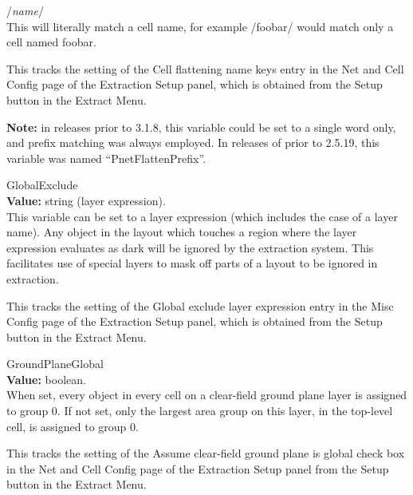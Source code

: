 \begin{description}
\begin{description}
\item{/{\it name\/}/}\\
This will literally match a cell name, for example {\vt /foobar/}
would match only a cell named {\vt foobar}.
\end{description}

This tracks the setting of the {\cb Cell flattening name keys} entry
in the {\cb Net and Cell Config} page of the {\cb Extraction Setup}
panel, which is obtained from the {\cb Setup} button in the {\cb
Extract Menu}.

{\bf Note:}  in {\Xic} releases prior to 3.1.8, this variable could be set
to a single word only, and prefix matching was always employed.  In
releases of {\Xic} prior to 2.5.19, this variable was named
``PnetFlattenPrefix''.

\item{\et GlobalExclude}\\
{\bf Value:} string (layer expression).\\
This variable can be set to a layer expression (which includes the
case of a layer name).  Any object in the layout which touches a
region where the layer expression evaluates as dark will be ignored by
the extraction system.  This facilitates use of special layers to mask
off parts of a layout to be ignored in extraction.

This tracks the setting of the {\cb Global exclude layer expression}
entry in the {\cb Misc Config} page of the {\cb Extraction Setup}
panel, which is obtained from the {\cb Setup} button in the {\cb
Extract Menu}.

\item{\et GroundPlaneGlobal}\\
{\bf Value:} boolean.\\
When set, every object in every cell on a clear-field ground plane
layer is assigned to group 0.  If not set, only the largest area group
on this layer, in the top-level cell, is assigned to group 0.

This tracks the setting of the {\cb Assume clear-field ground plane is
global} check box in the {\cb Net and Cell Config} page of the {\cb
Extraction Setup} panel from the {\cb Setup} button in the {\cb
Extract Menu}.


\end{description}

